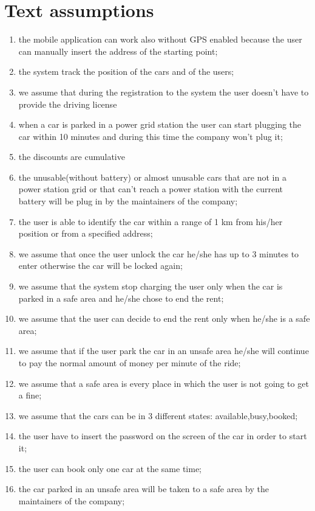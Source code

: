 \section{Text assumptions}
\begin{enumerate}
	\item the mobile application can work also without GPS enabled because the user can manually insert the address of the starting point;
	\item the system track the position of the cars and of the users;
	\item we assume that during the registration to the system the user doesn't have to provide the driving license
	\item when a car is parked in a power grid station the user can start plugging the car within 10 minutes and during this time the company won't plug it;
	\item the discounts are cumulative
	\item the unusable(without battery) or almost unusable cars that are not in a power station grid or that can't reach a power station with the current battery will be plug in by the maintainers of the company;
	\item the user is able to identify the car within a range of 1 km from his/her position or from a specified address;
	\item we assume that once the user unlock the car he/she has up to 3 minutes to enter otherwise the car will be locked again;
	\item we assume that the system stop charging the user only when the car is parked in a safe area and he/she chose to end the rent;
	\item we assume that the user can decide to end the rent only when he/she is a safe area;
	\item we assume that if the user park the car in an unsafe area he/she will continue to pay the normal amount of money per minute of the ride;
	\item we assume that a safe area is every  place in which the user is not going to get a fine;
	\item we assume that the cars can be in 3 different states: available,busy,booked;
	\item the user have to insert the password on the screen of the car in order to start it;
	\item the user can book only one car at the same time;
	\item the car parked in an unsafe area will be taken to a safe area by the maintainers of the company;

\end{enumerate}
